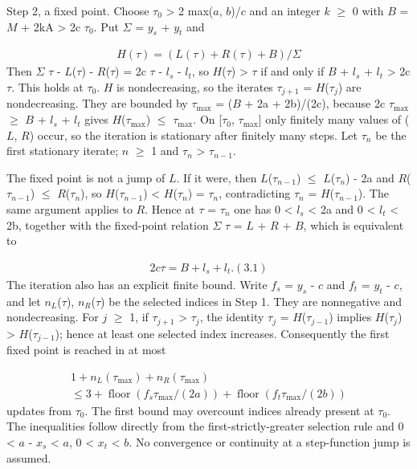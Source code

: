 \documentclass[11pt]{article}
\begin{document}
Step 2, a fixed point. Choose \(\tau_{0}\) > 2 max(\(a\), \(b\))/\(c\) and an integer \(k\) \(\ge\) 0 with \(B\) = \(M\) + 2kA > 2c \(\tau_{0}\). Put \(\Sigma\) = \(y_{s}\) + \(y_{t}\) and

\begin{gather*}
H(\tau) = (L(\tau) + R(\tau) + B)/\Sigma
\end{gather*}
Then \(\Sigma\) \(\tau\) - \(L\)(\(\tau\)) - \(R\)(\(\tau\)) = 2c \(\tau\) - \(l_{s}\) - \(l_{t}\), so \(H\)(\(\tau\)) > \(\tau\) if and only if \(B\) + \(l_{s}\) + \(l_{t}\) > 2c \(\tau\). This holds at \(\tau_{0}\). \(H\) is nondecreasing, so the iterates \(\tau_{j+1}\) = \(H\)(\(\tau_{j}\)) are nondecreasing. They are bounded by \(\tau_{\mathrm{max}}\) = (\(B\) + 2a + 2b)/(2c), because 2c \(\tau_{\mathrm{max}}\) \(\ge\) \(B\) + \(l_{s}\) + \(l_{t}\) gives \(H\)(\(\tau_{\mathrm{max}}\)) \(\le\) \(\tau_{\mathrm{max}}\). On [\(\tau_{0}\), \(\tau_{\mathrm{max}}\)] only finitely many values of (\(L\), \(R\)) occur, so the iteration is stationary after finitely many steps. Let \(\tau_{n}\) be the first stationary iterate; \(n\) \(\ge\) 1 and \(\tau_{n}\) > \(\tau_{n-1}\).

The fixed point is not a jump of \(L\). If it were, then \(L\)(\(\tau_{n-1}\)) \(\le\) \(L\)(\(\tau_{n}\)) - 2a and \(R\)(\(\tau_{n-1}\)) \(\le\) \(R\)(\(\tau_{n}\)), so \(H\)(\(\tau_{n-1}\)) < \(H\)(\(\tau_{n}\)) = \(\tau_{n}\), contradicting \(\tau_{n}\) = \(H\)(\(\tau_{n-1}\)). The same argument applies to \(R\). Hence at \(\tau\) = \(\tau_{n}\) one has 0 < \(l_{s}\) < 2a and 0 < \(l_{t}\) < 2b, together with the fixed-point relation \(\Sigma\) \(\tau\) = \(L\) + \(R\) + \(B\), which is equivalent to

\begin{gather*}
2c \tau = B + l_{s} + l_{t}.                                   (3.1)
\end{gather*}
The iteration also has an explicit finite bound. Write \(f_{s}\) = \(y_{s}\) - \(c\) and \(f_{t}\) = \(y_{t}\) - \(c\), and let \(n_{L}\)(\(\tau\)), \(n_{R}\)(\(\tau\)) be the selected indices in Step 1. They are nonnegative and nondecreasing. For \(j\) \(\ge\) 1, if \(\tau_{j+1}\) > \(\tau_{j}\), the identity \(\tau_{j}\) = \(H\)(\(\tau_{j-1}\)) implies \(H\)(\(\tau_{j}\)) > \(H\)(\(\tau_{j-1}\)); hence at least one selected index increases. Consequently the first fixed point is reached in at most

\begin{gather*}
1 + n_{L}(\tau_{\mathrm{max}}) + n_{R}(\tau_{\mathrm{max}}) \\
\le  3 + \operatorname{floor}(f_{s} \tau_{\mathrm{max}}/(2a)) + \operatorname{floor}(f_{t} \tau_{\mathrm{max}}/(2b))
\end{gather*}
updates from \(\tau_{0}\). The first bound may overcount indices already present at \(\tau_{0}\). The inequalities follow directly from the first-strictly-greater selection rule and 0 < \(a\) - \(x_{s}\) < \(a\), 0 < \(x_{t}\) < \(b\). No convergence or continuity at a step-function jump is assumed.
\end{document}
